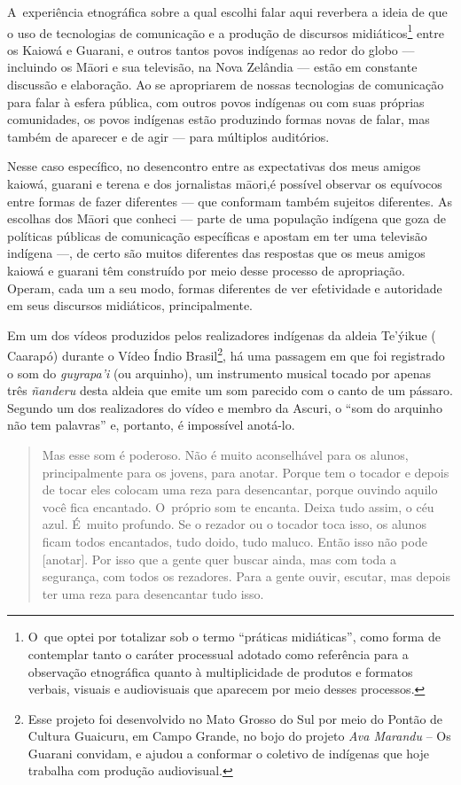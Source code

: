 A~experiência etnográfica sobre a qual escolhi falar aqui reverbera a
ideia de que o uso de tecnologias de comunicação e a produção de
discursos midiáticos\footnote{O~que optei por totalizar sob o termo
``práticas midiáticas'', como forma de contemplar tanto o caráter
processual adotado como referência para a observação etnográfica quanto
à multiplicidade de produtos e formatos verbais, visuais e audiovisuais
que aparecem por meio desses processos.} entre os Kaiowá e Guarani, e
outros tantos povos indígenas ao redor do globo --- incluindo os M\=aori
e sua televisão, na Nova Zelândia --- estão em constante discussão e
elaboração. Ao se apropriarem de nossas tecnologias de comunicação para
falar à esfera pública, com outros povos indígenas ou com suas próprias
comunidades, os povos indígenas estão produzindo formas novas de falar,
mas também de aparecer e de agir --- para múltiplos auditórios.

Nesse caso específico, no desencontro entre as expectativas dos meus
amigos kaiowá, guarani e terena e dos jornalistas m\=aori,é possível observar os
equívocos entre formas de fazer diferentes --- que conformam também
sujeitos diferentes. As escolhas dos M\=aori que conheci --- parte de uma
população indígena que goza de políticas públicas de comunicação
específicas e apostam em ter uma televisão indígena ---, de certo são
muitos diferentes das respostas que os meus amigos kaiowá e guarani têm
construído por meio desse processo de apropriação. Operam, cada um a
seu modo, formas diferentes de ver efetividade e autoridade em seus
discursos midiáticos, principalmente.

Em um dos vídeos produzidos pelos realizadores indígenas da aldeia
Te’ýikue ( Caarapó) durante o Vídeo Índio Brasil\footnote{Esse
projeto foi desenvolvido no Mato Grosso do Sul por meio do Pontão de
Cultura Guaicuru, em Campo Grande, no bojo do projeto \emph{Ava Marandu} -- Os
Guarani convidam, e ajudou a conformar o coletivo de indígenas que hoje
trabalha com produção audiovisual. }, há uma passagem em que foi
registrado o som do \emph{guyrapa’i} (ou arquinho), um instrumento musical
tocado por apenas três \emph{ñanderu} desta aldeia que emite um som parecido
com o canto de um pássaro. Segundo um dos realizadores do vídeo e
membro da Ascuri, o ``som do arquinho não tem palavras'' e, portanto, é
impossível anotá-lo.

\begin{quote}
Mas esse som é poderoso. Não é muito aconselhável para os alunos,
principalmente para os jovens, para anotar. Porque tem o tocador e
depois de tocar eles colocam uma reza para desencantar, porque ouvindo
aquilo você fica encantado. O~próprio som te encanta. Deixa tudo assim,
o céu azul. É~muito profundo. Se o rezador ou o tocador toca isso, os
alunos ficam todos encantados, tudo doido, tudo maluco. Então isso não
pode [anotar]. Por isso que a gente quer buscar ainda, mas com toda a
segurança, com todos os rezadores. Para a gente ouvir, escutar, mas
depois ter uma reza para desencantar tudo isso.
\end{quote}

